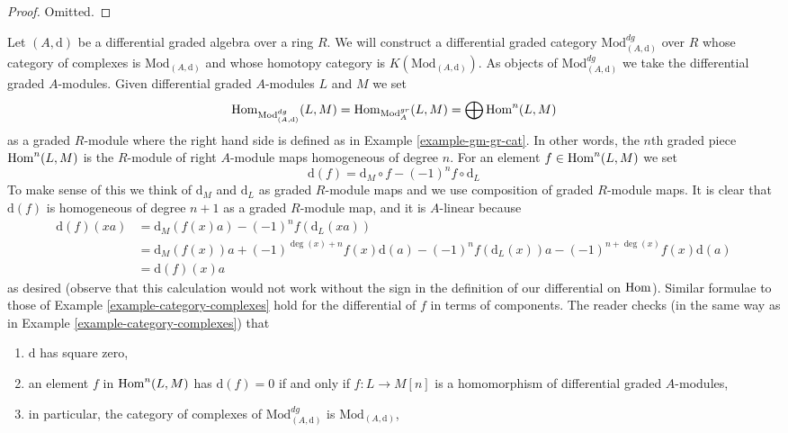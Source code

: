 \begin{proof}
Omitted.
\end{proof}

\begin{example}
\label{example-dgm-dg-cat}
Let $(A, \text{d})$ be a differential graded algebra over a ring $R$. We will
construct a differential graded category $\text{Mod}^{dg}_{(A, \text{d})}$
over $R$ whose category of complexes is $\text{Mod}_{(A, \text{d})}$ and
whose homotopy category is $K(\text{Mod}_{(A, \text{d})})$.
As objects of $\text{Mod}^{dg}_{(A, \text{d})}$
we take the differential graded $A$-modules. Given differential
graded $A$-modules $L$ and $M$ we set
$$
\mathop{\mathrm{Hom}}\nolimits_{\text{Mod}^{dg}_{(A, \text{d})}}(L, M) =
\mathop{\mathrm{Hom}}\nolimits_{\text{Mod}^{gr}_A}(L, M) = \bigoplus \mathop{\mathrm{Hom}}\nolimits^n(L, M)
$$
as a graded $R$-module where the right hand side is defined as in
Example \ref{example-gm-gr-cat}. In other words, the $n$th graded piece
$\mathop{\mathrm{Hom}}\nolimits^n(L, M)$ is the $R$-module of right $A$-module maps homogeneous
of degree $n$. For an element $f \in \mathop{\mathrm{Hom}}\nolimits^n(L, M)$ we set
$$
\text{d}(f) = \text{d}_M \circ f - (-1)^n f \circ \text{d}_L
$$
To make sense of this we think of $\text{d}_M$ and $\text{d}_L$
as graded $R$-module maps and we use composition of graded
$R$-module maps. It is clear that $\text{d}(f)$ is homogeneous of
degree $n + 1$ as a graded $R$-module map, and it is $A$-linear
because
\begin{align*}
\text{d}(f)(xa)
& =
\text{d}_M(f(x) a) - (-1)^n f (\text{d}_L(xa)) \\
& =
\text{d}_M(f(x)) a + (-1)^{\deg(x) + n} f(x) \text{d}(a) 
- (-1)^n f(\text{d}_L(x)) a - (-1)^{n + \deg(x)} f(x) \text{d}(a) \\
& = \text{d}(f)(x) a
\end{align*}
as desired (observe that this calculation would not work without the
sign in the definition of our differential on $\mathop{\mathrm{Hom}}\nolimits$). Similar formulae
to those of Example \ref{example-category-complexes} hold for the
differential of $f$ in terms of components.
The reader checks (in the same way as in
Example \ref{example-category-complexes}) that
\begin{enumerate}
\item $\text{d}$ has square zero,
\item an element $f$ in $\mathop{\mathrm{Hom}}\nolimits^n(L, M)$ has $\text{d}(f) = 0$ if and only if
$f : L \to M[n]$ is a homomorphism of differential graded $A$-modules,
\item in particular, the category of complexes of
$\text{Mod}^{dg}_{(A, \text{d})}$ is $\text{Mod}_{(A, \text{d})}$,

\end{enumerate}
\end{example}
